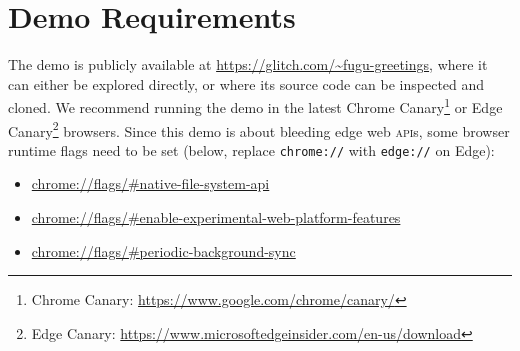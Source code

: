 \documentclass[sigconf, anonymous]{acmart}
\begin{document}



\appendix

\section{Demo Requirements}

The demo is publicly available at \url{https://glitch.com/~fugu-greetings},
where it can either be explored directly,
or where its source code can be inspected and cloned.
We recommend running the demo in the latest Chrome
Canary\footnote{Chrome Canary: \url{https://www.google.com/chrome/canary/}}
or Edge
Canary\footnote{Edge Canary: \url{https://www.microsoftedgeinsider.com/en-us/download}}
browsers.
Since this demo is about bleeding edge web \textsc{api}s,
some browser runtime flags need to be set (below, replace \texttt{chrome://}
with \texttt{edge://} on Edge):

\begin{itemize}
  \item \url{chrome://flags/#native-file-system-api}
  \item \url{chrome://flags/#enable-experimental-web-platform-features}  
  \item \url{chrome://flags/#periodic-background-sync}
\end{itemize}
\end{document}
